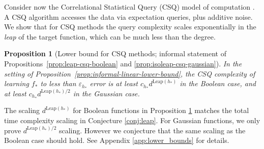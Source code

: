 \documentclass[11pt]{article}
\newcommand{\eps}{\varepsilon}
\newcommand{\<}{\langle}
\renewcommand{\>}{\rangle}
\newtheorem{proposition}{Proposition}
\theoremstyle{definition}
\def\eps{\varepsilon}
\def\Leap{\mathrm{Leap}}
\begin{document}
Consider now the Correlational Statistical Query (CSQ) model of computation \citep{bendavid1995learning,bshouty2002using}. A CSQ algorithm accesses the data via expectation queries, plus additive noise. We show that for CSQ methods the query complexity scales exponentially in the \textit{leap} of the target function, which can be much less than the degree. %


\begin{proposition}[Lower bound for CSQ methods; informal statement of Propositions~\ref{prop:leap-csq-boolean} and \ref{prop:isoleap-csq-gaussian}]\label{prop:informal_CSQ}
In the setting of Proposition~\ref{prop:informal-linear-lower-bound}, the CSQ complexity of learning $f_*$ to less than $\eps_{h_*}$ error is at least $c_{h_*} d^{\Leap(h_*)}$ in the Boolean case, and at least $c_{h_*} d^{\Leap(h_*) / 2}$ in the Gaussian case.
\end{proposition}


 
The scaling $d^{\Leap (h_*)}$ for Boolean functions in Proposition \ref{prop:informal_CSQ} matches the total time complexity scaling in Conjecture \ref{conj:leap}. For Gaussian functions, we only prove $d^{\Leap (h_*)/2}$ scaling. However we conjecture that the same scaling as the Boolean case should hold.
See Appendix \ref{app:lower_bounds} for details.
\end{document}
